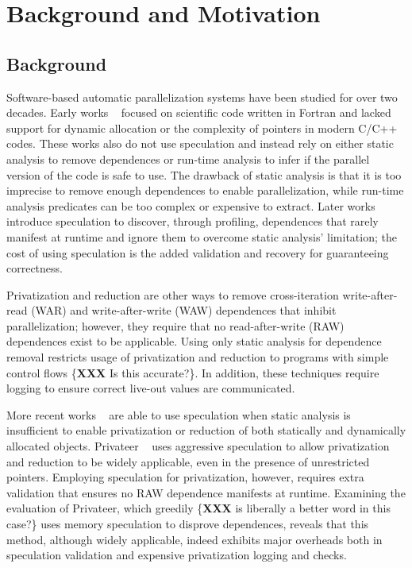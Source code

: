 \section{Background and Motivation}
\label{sec:motivation}


\subsection{Background}
Software-based automatic parallelization systems have been studied for over
two decades.
%
Early works
~\cite{blume:96:icpp,suif:94:stanford}
focused on scientific code written in Fortran and lacked support for
dynamic allocation or the complexity of pointers in modern C/C++ codes.
These works also do not use speculation and instead rely on either static
analysis to remove dependences or run-time analysis to infer if the
parallel version of the code is safe to use. The drawback of static
analysis is that it is too imprecise to remove enough dependences to enable
parallelization, while run-time analysis predicates can be too complex or
expensive to extract. Later works ~\cite{Rus:07:ics,rus:03:hybrid,rauchwerger:99:pds}
introduce speculation to discover, through profiling, dependences that rarely
manifest at runtime and ignore them to overcome static analysis' limitation;
the cost of using speculation is the added validation and recovery for
guaranteeing correctness.

Privatization and reduction are other ways to remove cross-iteration
write-after-read (WAR) and write-after-write (WAW) dependences that inhibit
parallelization; however, they require that no read-after-write (RAW)
dependences exist to be applicable. Using only static analysis for
dependence removal restricts usage of privatization and reduction to
programs with simple control flows \{\textbf{XXX} Is this accurate?\}.
In addition, these techniques require logging to ensure correct live-out
values are communicated.

More recent works ~\cite{mehrara:09:stmlite,kim:12:cgo,johnson:12:pldi} are
able to use speculation when static analysis is insufficient to enable
privatization or reduction of both statically and dynamically allocated
objects. Privateer ~\cite{johnson:12:pldi} uses aggressive
speculation to allow privatization and reduction to be widely applicable,
even in the presence of unrestricted pointers.
Employing speculation for privatization, however, requires extra validation
that ensures no RAW dependence manifests at runtime. Examining the
evaluation of Privateer, which greedily \{\textbf{XXX} is liberally a
better word in this case?\} uses memory speculation to disprove
dependences, reveals that this method, although widely applicable, indeed
exhibits major overheads both in speculation validation and expensive
privatization logging and checks.

